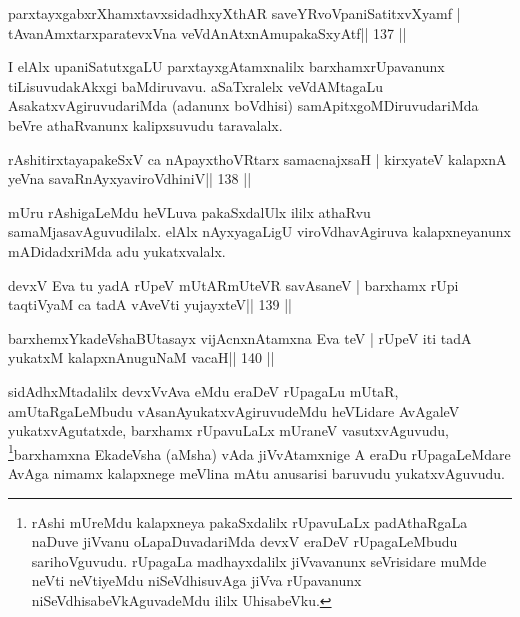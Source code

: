 
\begin{shl}
parxtayxgabxrXhamxtavxsidadhxyXthAR saveYRvoVpaniSatitxvXyamf |
tAvanAmxtarxparatevxVna veVdAnAtxnAmupakaSxyAtf\hfill || 137 ||
\end{shl}

\begin{artha}
I elAlx upaniSatutxgaLU parxtayxgAtamxnalilx barxhamxrUpavanunx tiLisuvudakAkxgi baMdiruvavu. aSaTxralelx veVdAMtagaLu AsakatxvAgiruvudariMda (adanunx boVdhisi) samApitxgoMDiruvudariMda beVre athaRvanunx kalipxsuvudu taravalalx.
\end{artha}


\begin{shl}
rAshitirxtayapakeSxV ca nApayxthoVR\s tarx samacnajxsaH |
kirxyateV kalapxnA yeVna savaRnAyxyaviroVdhiniV\hfill || 138 ||
\end{shl}

\begin{artha}
mUru rAshigaLeMdu heVLuva pakaSxdalUlx ililx athaRvu samaMjasavAguvudilalx. elAlx nAyxyagaLigU viroVdhavAgiruva kalapxneyanunx mADidadxriMda adu yukatxvalalx.
\end{artha}


\begin{shl}
devxV Eva tu yadA rUpeV mUtARmUteVR savAsaneV |
barxhamx rUpi taqtiVyaM ca tadA vAveVti yujayxteV\hfill || 139 ||
\end{shl}

\begin{shl}
barxhemxYkadeVshaBUtasayx vijAcnxnAtamxna Eva teV |
rUpeV iti tadA yukatxM kalapxnAnuguNaM vacaH\hfill || 140 ||
\end{shl}

\begin{artha}
sidAdhxMtadalilx devxVvAva eMdu eraDeV rUpagaLu  mUtaR, amUtaRgaLeMbudu
vAsanAyukatxvAgiruvudeMdu heVLidare AvAgaleV yukatxvAgutatxde, barxhamx
rUpavuLaLx mUraneV vasutxvAguvudu, \footnote{rAshi mUreMdu
  kalapxneya pakaSxdalilx rUpavuLaLx padAthaRgaLa naDuve jiVvanu
  oLapaDuvadariMda devxV eraDeV rUpagaLeMbudu sarihoVguvudu. rUpagaLa
  madhayxdalilx jiVvavanunx seVrisidare muMde neVti neVtiyeMdu
  niSeVdhisuvAga jiVva rUpavanunx niSeVdhisabeVkAguvadeMdu ililx
  UhisabeVku.}barxhamxna EkadeVsha
(aMsha) vAda jiVvAtamxnige A eraDu rUpagaLeMdare AvAga nimamx
kalapxnege meVlina mAtu anusarisi baruvudu yukatxvAguvudu.
\end{artha}

